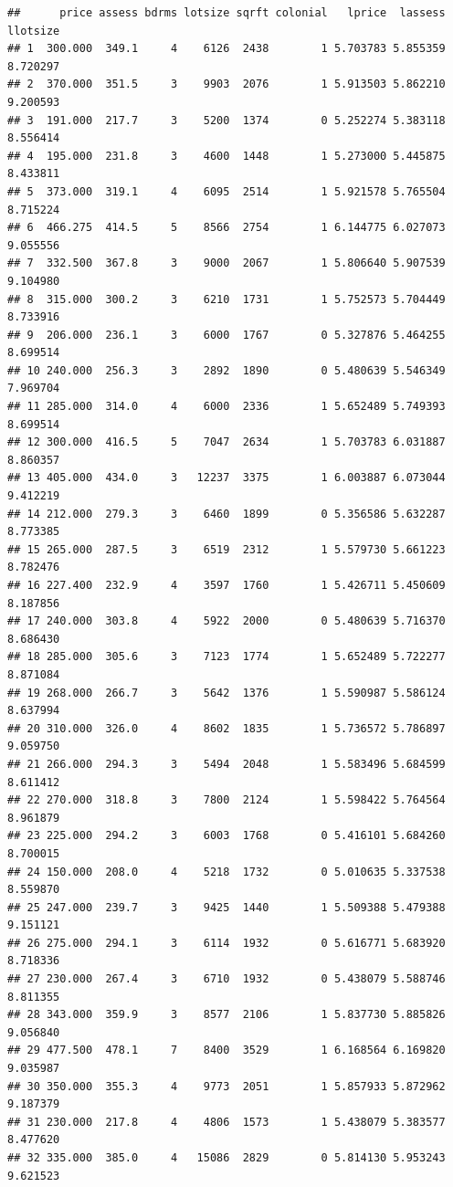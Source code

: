 \documentclass[
]{book}
\theoremstyle{definition}
\theoremstyle{definition}
\theoremstyle{definition}
\theoremstyle{definition}
\theoremstyle{remark}
\begin{document}
\begin{verbatim}
##      price assess bdrms lotsize sqrft colonial   lprice  lassess  llotsize
## 1  300.000  349.1     4    6126  2438        1 5.703783 5.855359  8.720297
## 2  370.000  351.5     3    9903  2076        1 5.913503 5.862210  9.200593
## 3  191.000  217.7     3    5200  1374        0 5.252274 5.383118  8.556414
## 4  195.000  231.8     3    4600  1448        1 5.273000 5.445875  8.433811
## 5  373.000  319.1     4    6095  2514        1 5.921578 5.765504  8.715224
## 6  466.275  414.5     5    8566  2754        1 6.144775 6.027073  9.055556
## 7  332.500  367.8     3    9000  2067        1 5.806640 5.907539  9.104980
## 8  315.000  300.2     3    6210  1731        1 5.752573 5.704449  8.733916
## 9  206.000  236.1     3    6000  1767        0 5.327876 5.464255  8.699514
## 10 240.000  256.3     3    2892  1890        0 5.480639 5.546349  7.969704
## 11 285.000  314.0     4    6000  2336        1 5.652489 5.749393  8.699514
## 12 300.000  416.5     5    7047  2634        1 5.703783 6.031887  8.860357
## 13 405.000  434.0     3   12237  3375        1 6.003887 6.073044  9.412219
## 14 212.000  279.3     3    6460  1899        0 5.356586 5.632287  8.773385
## 15 265.000  287.5     3    6519  2312        1 5.579730 5.661223  8.782476
## 16 227.400  232.9     4    3597  1760        1 5.426711 5.450609  8.187856
## 17 240.000  303.8     4    5922  2000        0 5.480639 5.716370  8.686430
## 18 285.000  305.6     3    7123  1774        1 5.652489 5.722277  8.871084
## 19 268.000  266.7     3    5642  1376        1 5.590987 5.586124  8.637994
## 20 310.000  326.0     4    8602  1835        1 5.736572 5.786897  9.059750
## 21 266.000  294.3     3    5494  2048        1 5.583496 5.684599  8.611412
## 22 270.000  318.8     3    7800  2124        1 5.598422 5.764564  8.961879
## 23 225.000  294.2     3    6003  1768        0 5.416101 5.684260  8.700015
## 24 150.000  208.0     4    5218  1732        0 5.010635 5.337538  8.559870
## 25 247.000  239.7     3    9425  1440        1 5.509388 5.479388  9.151121
## 26 275.000  294.1     3    6114  1932        0 5.616771 5.683920  8.718336
## 27 230.000  267.4     3    6710  1932        0 5.438079 5.588746  8.811355
## 28 343.000  359.9     3    8577  2106        1 5.837730 5.885826  9.056840
## 29 477.500  478.1     7    8400  3529        1 6.168564 6.169820  9.035987
## 30 350.000  355.3     4    9773  2051        1 5.857933 5.872962  9.187379
## 31 230.000  217.8     4    4806  1573        1 5.438079 5.383577  8.477620
## 32 335.000  385.0     4   15086  2829        0 5.814130 5.953243  9.621523

\end{verbatim}
\end{document}
